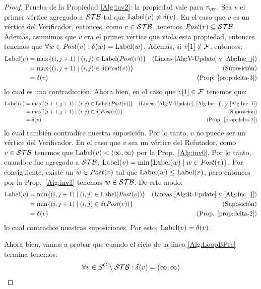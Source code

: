 \begin{proof}
Prueba de la Propiedad \ref{Alg:inv2}: la propiedad vale para $\ErrorSt$. Sea $v$ el primer vértice agregado a $\STB$ tal que $\Label(v) \neq \delta(v)$. En el caso que $v$ es un vértice del Verificador, entonces, como $v \in \STB$, tenemos $\post(v) \subseteq \STB$. Además, asumimos que $v$ era el primer vértice que viola esta propiedad, entonces tenemos que $\forall w \in \post(v):\delta(w)=\Label(w)$. Además, si $\pr{1}{v} \notin \Faults$, entonces: 
\begin{align*}
\Label(v) & = \max \{(i,j+1) \mid (i,j) \in \Label(\post(v))\}&  \text{(Lineas \ref{Alg:V-Update} y \ref{Alg:Inc_j})}\\
	      & =  \max \{(i,j+1) \mid (i,j) \in \delta(\post(v))\}&  \text{(Suposición)}\\
	      & = \delta(v)& \text{(Prop. \ref{prop:delta-3})}
\end{align*}
lo cual es una contradicción. Ahora bien, en el caso que $\pr{1}{v} \in \Faults$ tenemos que:
\begin{align*}
\Label(v) & = \max \{(i+1,j+1) \mid (i,j) \in \Label(\post(v))\}&  \text{(Lineas \ref{Alg:V-Update}, \ref{Alg:Inc_j}, y \ref{Alg:Inc_i})}\\
	      & =  \max \{(i+1,j+1) \mid (i,j) \in \delta(\post(v))\}&  \text{(Suposición)}\\
	      & = \delta(v)& \text{(Prop. \ref{prop:delta-2})}
\end{align*}
lo cual también contradice nuestra suposición. Por lo tanto, $v$ no puede ser un vértice del Verificador. 
En el caso que $v$ sea un vértice del Refutador, como $v \in \STB$ tenemos que $\Label(v) < (\infty, \infty)$ por la Prop.~\ref{Alg:inv0}. 
Por lo tanto, cuando $v$ fue agregado a $\STB$, $\Label(v) = \min\{ \Label(w) \mid w \in \post(v)\}$. Por consiguiente, 
existe un $w \in \post(v)$ tal que $\Label(w) \leq \Label(v)$, pero entonces por la Prop.~\ref{Alg:inv1} 
tenemos $w \in \STB$. De este modo:
\begin{align*}
\Label(v) & = \min \{(i,j+1) \mid (i,j) \in \Label(\post(v))\}&  \text{(Lineas \ref{Alg:R-Update} y \ref{Alg:Inc_j})} \\
	      & =  \min \{(i,j+1) \mid (i,j) \in \delta(\post(v))\}&  \text{(Suposición)}\\
	      & = \delta(v)& \text{(Prop. \ref{prop:delta-2})}
\end{align*}
lo cual contradice nuestras suposiciones. Por esto, $\Label(v) = \delta(v)$.

Ahora bien, vamos a probar que cuando el ciclo de la linea \ref{Alg:LoopBPre} termina tenemos:
\begin{equation}\label{Alg:inv3}
 \forall v \in S^G \setminus \STB : \delta(v)=(\infty, \infty)
\end{equation}


\end{proof}
